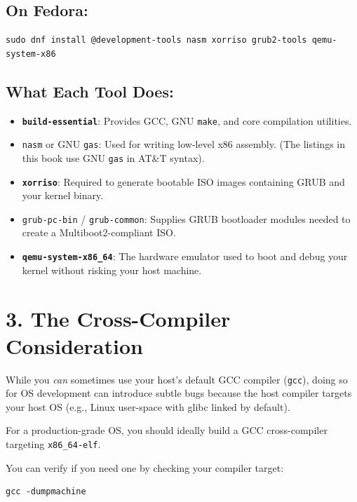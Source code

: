 \subsection{On Fedora:}

\begin{lstlisting}
sudo dnf install @development-tools nasm xorriso grub2-tools qemu-system-x86

\end{lstlisting}

\subsection{What Each Tool Does:}

\begin{itemize}
\tightlist
\item
  \textbf{\texttt{build-essential}}: Provides GCC, GNU \texttt{make}, and core compilation utilities.
\item
  \texttt{nasm} or GNU \texttt{gas}: Used for writing low-level x86 assembly. (The listings in this book use GNU \texttt{gas} in AT\&T syntax).
\item
  \textbf{\texttt{xorriso}}: Required to generate bootable ISO images containing GRUB and your kernel binary.
\item
  \texttt{grub-pc-bin} / \texttt{grub-common}: Supplies GRUB bootloader modules needed to create a Multiboot2-compliant ISO.
\item
  \textbf{\texttt{qemu-system-x86\_64}}: The hardware emulator used to boot and debug your kernel without risking your host machine.
\end{itemize}

\section{3. The Cross-Compiler Consideration}

While you \emph{can} sometimes use your host's default GCC compiler (\texttt{gcc}), doing so for OS development can introduce subtle bugs because the host compiler targets your host OS (e.g., Linux user-space with glibc linked by default).

For a production-grade OS, you should ideally build a GCC cross-compiler targeting \texttt{x86\_64-elf}.

You can verify if you need one by checking your compiler target:

\begin{lstlisting}
gcc -dumpmachine

\end{lstlisting}

